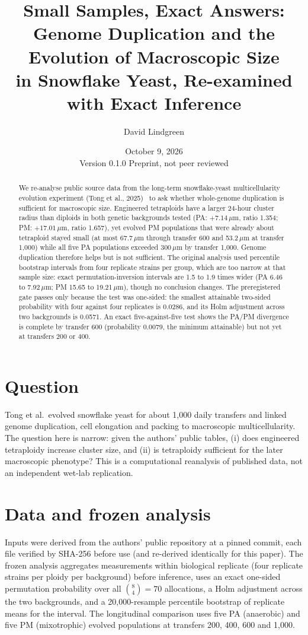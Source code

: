 \documentclass[11pt]{article}
\title{Small Samples, Exact Answers:\\
Genome Duplication and the Evolution of Macroscopic Size\\
in Snowflake Yeast, Re-examined with Exact Inference}
\author{David Lindgreen}
\date{October 9, 2026 \\[2pt] \small Version 0.1.0 \quad Preprint, not peer reviewed}
\begin{document}
\maketitle

\begin{abstract}
We re-analyse public source data from the long-term snowflake-yeast multicellularity evolution experiment (Tong et
al., 2025)~\cite{tong2025} to ask whether whole-genome duplication is sufficient for macroscopic size. Engineered
tetraploids have a larger 24-hour cluster radius than diploids in both genetic backgrounds tested (PA: $+7.14\,\mu$m, ratio 1.354;
PM: $+17.01\,\mu$m, ratio 1.657), yet evolved PM populations that were already about tetraploid stayed small
(at most 67.7\,$\mu$m through transfer 600 and 53.2\,$\mu$m at transfer 1{,}000) while all five PA populations exceeded
300\,$\mu$m by transfer 1{,}000. Genome duplication therefore helps but is not sufficient. The original analysis used percentile
bootstrap intervals from four replicate strains per group, which are too narrow at that sample size: exact permutation-inversion
intervals are 1.5 to 1.9 times wider (PA 6.46 to 7.92\,$\mu$m; PM 15.65 to 19.21\,$\mu$m), though no conclusion changes. The
preregistered gate passes only because the test was one-sided: the smallest attainable two-sided probability with four against
four replicates is 0.0286, and its Holm adjustment across two backgrounds is 0.0571. An exact five-against-five test shows the PA/PM
divergence is complete by transfer 600 (probability 0.0079, the minimum attainable) but not yet at transfers 200 or 400.
\end{abstract}

\section{Question}
Tong et al.\ evolved snowflake yeast for about 1{,}000 daily transfers and linked genome duplication, cell elongation and packing to
macroscopic multicellularity. The question here is narrow: given the authors' public tables, (i) does engineered tetraploidy
increase cluster size, and (ii) is tetraploidy sufficient for the later macroscopic phenotype? This is a computational reanalysis of
published data, not an independent wet-lab replication.

\section{Data and frozen analysis}
Inputs were derived from the authors' public repository at a pinned commit, each file verified by SHA-256 before use (and re-derived
identically for this paper). The frozen analysis aggregates measurements within biological replicate (four replicate strains per ploidy
per background) before inference, uses an exact one-sided permutation probability over all $\binom{8}{4}=70$ allocations, a Holm
adjustment across the two backgrounds, and a 20{,}000-resample percentile bootstrap of replicate means for the interval. The
longitudinal comparison uses five PA (anaerobic) and five PM (mixotrophic) evolved populations at transfers 200, 400, 600 and 1{,}000.
\end{document}
